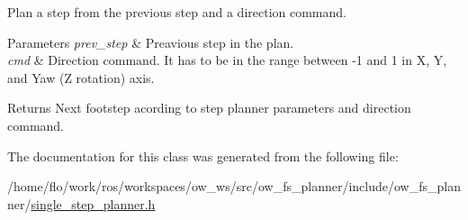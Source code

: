 Plan a step from the previous step and a direction command. 


\begin{DoxyParams}{Parameters}
{\em prev\+\_\+step} & Preavious step in the plan.\\
\hline
{\em cmd} & Direction command. It has to be in the range between -\/1 and 1 in X, Y, and Yaw (Z rotation) axis.\\
\hline
\end{DoxyParams}
\begin{DoxyReturn}{Returns}
Next footstep acording to step planner parameters and direction command. 
\end{DoxyReturn}


The documentation for this class was generated from the following file\+:\begin{DoxyCompactItemize}
\item 
/home/flo/work/ros/workspaces/ow\+\_\+ws/src/ow\+\_\+fs\+\_\+planner/include/ow\+\_\+fs\+\_\+planner/\hyperlink{single__step__planner_8h}{single\+\_\+step\+\_\+planner.\+h}\end{DoxyCompactItemize}
